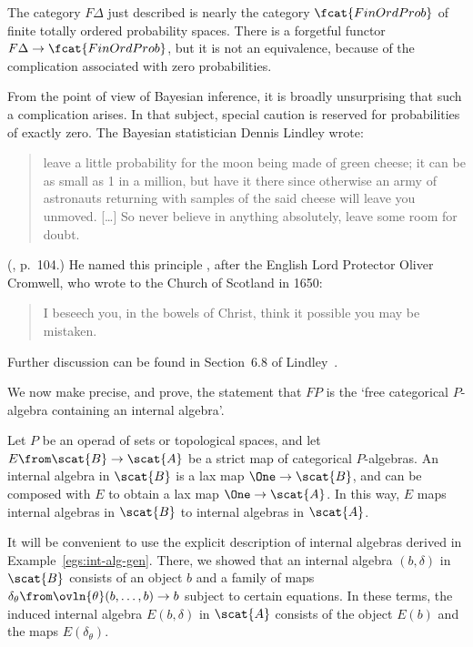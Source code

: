 \begin{remark}
The category $F\Delta$ just described is nearly the category
$\fcat{FinOrdProb}$ of finite totally ordered%
%
%
% 
probability spaces.  There is a forgetful functor $F\Delta \to
\fcat{FinOrdProb}$, but it is not an equivalence, because of the
complication associated with zero probabilities.

From the point of view of Bayesian%
% 
% 
inference, it is broadly unsurprising that such a complication arises.  In
that subject, special caution is reserved for probabilities of exactly
zero.  The Bayesian statistician Dennis Lindley%
%
%
wrote:
% 
\begin{quote}
leave a little probability for the moon%
% 
% 
being made of green%
%
% 
cheese; it can be as small as 1 in a million, but have it there since
otherwise an army of astronauts returning with samples of the said cheese
will leave you unmoved.  [\ldots] So never believe in anything absolutely,
leave some room for doubt.
\end{quote}
% 
(\cite{LindMD}, p.~104.)  He named this principle ,
after the English Lord Protector Oliver Cromwell, who wrote to the Church
of Scotland in 1650:
% 
\begin{quote}
I beseech you, in the bowels of Christ, think it possible you may be
mistaken. 
\end{quote}
% 
Further discussion can be found in Section~6.8 of Lindley~\cite{LindUU}.
\end{remark}

We now make precise, and prove, the statement that $FP$ is the `free%
%
%
%
categorical $P$-algebra containing an internal algebra'.

Let $P$ be an operad of sets or topological spaces, and let $E \from
\scat{B} \to \scat{A}$ be a strict map of categorical $P$-algebras.  An
internal algebra in $\scat{B}$ is a lax map $\One \to \scat{B}$, and can be
composed with $E$ to obtain a lax map $\One \to \scat{A}$.  In this way,
$E$ maps internal algebras in $\scat{B}$ to internal algebras in
$\scat{A}$.

It will be convenient to use the explicit description of internal algebras
derived in Example~\ref{egs:int-alg-gen}.  There,
we showed that an internal algebra $(b, \delta)$ in $\scat{B}$ consists of
an object $b$ and a family of maps $\delta_\theta \from \ovln{\theta}(b,
\ldots, b) \to b$ subject to certain equations.  In these terms, the
induced internal algebra $E(b, \delta)$ in $\scat{A}$ consists of the
object $E(b)$ and the maps $E(\delta_\theta)$.

